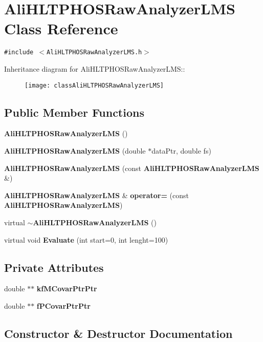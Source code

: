 \section{Ali\-HLTPHOSRaw\-Analyzer\-LMS Class Reference}
\label{classAliHLTPHOSRawAnalyzerLMS}
{\tt \#include $<$Ali\-HLTPHOSRaw\-Analyzer\-LMS.h$>$}

Inheritance diagram for Ali\-HLTPHOSRaw\-Analyzer\-LMS::\begin{figure}[H]
\begin{center}
\leavevmode
\texttt{[image: classAliHLTPHOSRawAnalyzerLMS]}
\end{center}
\end{figure}
\subsection*{Public Member Functions}
\begin{CompactItemize}
\item 
{\bf Ali\-HLTPHOSRaw\-Analyzer\-LMS} ()
\item 
{\bf Ali\-HLTPHOSRaw\-Analyzer\-LMS} (double $\ast$data\-Ptr, double fs)
\item 
{\bf Ali\-HLTPHOSRaw\-Analyzer\-LMS} (const {\bf Ali\-HLTPHOSRaw\-Analyzer\-LMS} \&)
\item 
{\bf Ali\-HLTPHOSRaw\-Analyzer\-LMS} \& {\bf operator=} (const {\bf Ali\-HLTPHOSRaw\-Analyzer\-LMS})
\item 
virtual {\bf $\sim$Ali\-HLTPHOSRaw\-Analyzer\-LMS} ()
\item 
virtual void {\bf Evaluate} (int start=0, int lenght=100)
\end{CompactItemize}
\subsection*{Private Attributes}
\begin{CompactItemize}
\item 
double $\ast$$\ast$ {\bf kf\-MCovar\-Ptr\-Ptr}
\item 
double $\ast$$\ast$ {\bf f\-PCovar\-Ptr\-Ptr}
\end{CompactItemize}


\subsection{Constructor \& Destructor Documentation}
